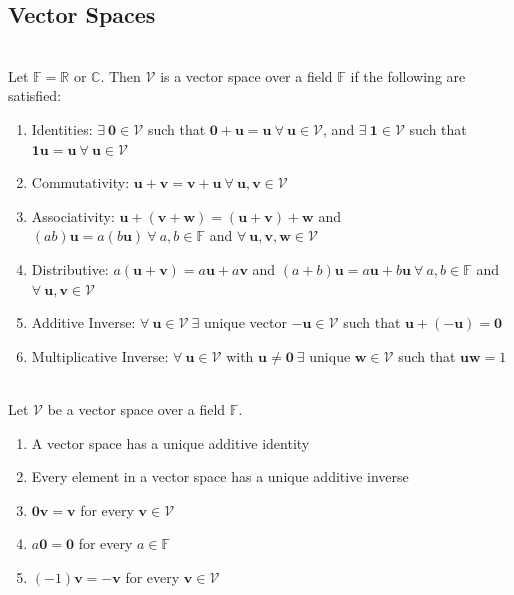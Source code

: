 \subsection{Vector Spaces}

\begin{definition} \\
Let $\mathbb{F} = \mathbb{R}$ or $\mathbb{C}$. Then $\mathcal{V}$ is a vector space over a field $\mathbb{F}$ if the following are satisfied:
\begin{enumerate}[label=\roman*.]
\setlength{\itemsep}{0pt}
\item Identities: $\exists \ \mathbf{0} \in \mathcal{V}$ such that $\mathbf{0} + \mathbf{u} = \mathbf{u} \ \forall \ \mathbf{u} \in \mathcal{V}$, and $\exists \ \mathbf{1} \in \mathcal{V}$ such that $\mathbf{1} \mathbf{u} = \mathbf{u} \ \forall \ \mathbf{u} \in \mathcal{V}$
\item Commutativity: $\mathbf{u} + \mathbf{v} = \mathbf{v} + \mathbf{u} \ \forall \ \mathbf{u}, \mathbf{v} \in \mathcal{V}$
\item Associativity: $\mathbf{u} + (\mathbf{v} + \mathbf{w}) = (\mathbf{u} + \mathbf{v}) + \mathbf{w}$ and $(ab) \mathbf{u} = a(b \mathbf{u}) \ \forall \ a, b \in \mathbb{F}$ and $\forall \ \mathbf{u}, \mathbf{v}, \mathbf{w} \in \mathcal{V}$
\item Distributive: $a(\mathbf{u} + \mathbf{v}) = a \mathbf{u} + a \mathbf{v}$ and $(a + b)\mathbf{u} = a \mathbf{u} + b \mathbf{u} \ \forall \ a, b \in \mathbb{F}$ and $\forall \ \mathbf{u}, \mathbf{v} \in \mathcal{V}$
\item Additive Inverse: $\forall \ \mathbf{u} \in \mathcal{V} \ \exists$ unique vector $-\mathbf{u} \in \mathcal{V}$ such that $\mathbf{u} + (- \mathbf{u}) = \mathbf{0}$
\item Multiplicative Inverse: $\forall \ \mathbf{u} \in \mathcal{V}$ with $\mathbf{u} \neq \mathbf{0} \ \exists$ unique $\mathbf{w} \in \mathcal{V}$ such that $\mathbf{u} \mathbf{w} = 1$
\end{enumerate}
\end{definition}

\begin{remark} \\
Let $\mathcal{V}$ be a vector space over a field $\mathbb{F}$.
\begin{enumerate}[label=\roman*.]
\setlength{\itemsep}{0pt}
\item A vector space has a unique additive identity
\item Every element in a vector space has a unique additive inverse
\item $\mathbf{0} \mathbf{v} = \mathbf{v}$ for every $\mathbf{v} \in \mathcal{V}$
\item $a\mathbf{0} = \mathbf{0}$ for every $a \in \mathbb{F}$
\item $(-1)\mathbf{v} = -\mathbf{v}$ for every $\mathbf{v} \in \mathcal{V}$
\end{enumerate}
\end{remark}

